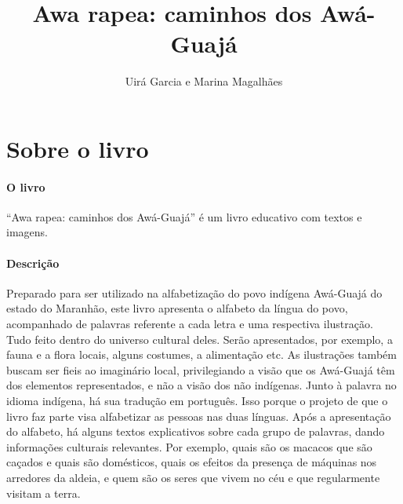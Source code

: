 \documentclass[11pt]{extarticle}
\newcommand{\AutorLivro}{Uirá Garcia e Marina Magalhães}
\newcommand{\TituloLivro}{Awa rapea: caminhos dos Awá-Guajá}
\newcommand{\colaborador}{{Paulo Pompermaier e Renier Silva}}
\begin{document}
\title{\TituloLivro}
\author{\AutorLivro}
\def\authornotes{\colaborador}

\date{}
\maketitle


\tableofcontents



\section{Sobre o livro}

\paragraph{O livro} 
``Awa rapea: caminhos dos Awá-Guajá'' é um livro educativo com textos e imagens. 

\paragraph{Descrição} 
Preparado para ser utilizado na alfabetização do povo indígena Awá-Guajá do estado
do Maranhão, este livro apresenta o alfabeto da língua do povo, acompanhado de 
palavras referente a cada letra e uma respectiva ilustração. Tudo feito dentro do universo
cultural deles. Serão apresentados, por exemplo, a fauna e a flora locais, alguns costumes, a alimentação
etc. As ilustrações também buscam ser fieis ao imaginário local, privilegiando a 
visão que os Awá-Guajá têm dos elementos representados, e não a visão dos não indígenas. 
Junto à palavra no idioma indígena, há sua tradução em português. Isso porque 
o projeto de que o livro faz parte visa alfabetizar as pessoas nas duas línguas. 
Após a apresentação do alfabeto, há alguns textos explicativos sobre cada grupo de
palavras, dando informações culturais relevantes. Por exemplo, quais são os macacos
que são caçados e quais são domésticos, quais os efeitos da presença de máquinas
nos arredores da aldeia, e quem são os seres que vivem no céu e que regularmente
visitam a terra. 

\end{document}
